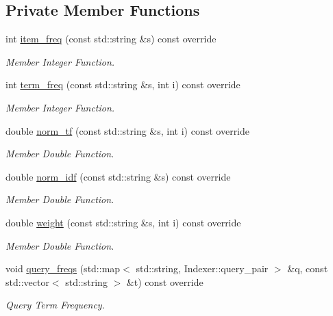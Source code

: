 \subsection*{Private Member Functions}
\begin{DoxyCompactItemize}
\item 
int \hyperlink{class_document_indexer_a302fed9a2c33a60bc7d9d7bcb03902fa}{item\+\_\+freq} (const std\+::string \&s) const override
\begin{DoxyCompactList}\small\item\em Member Integer Function. \end{DoxyCompactList}\item 
int \hyperlink{class_document_indexer_aba9275a0648629cab3772e75519938e8}{term\+\_\+freq} (const std\+::string \&s, int i) const override
\begin{DoxyCompactList}\small\item\em Member Integer Function. \end{DoxyCompactList}\item 
double \hyperlink{class_document_indexer_a91cbacd5c82134b2ba6ab79e06fa4a60}{norm\+\_\+tf} (const std\+::string \&s, int i) const override
\begin{DoxyCompactList}\small\item\em Member Double Function. \end{DoxyCompactList}\item 
double \hyperlink{class_document_indexer_a1c366e241572edc6e1d256db906cac43}{norm\+\_\+idf} (const std\+::string \&s) const override
\begin{DoxyCompactList}\small\item\em Member Double Function. \end{DoxyCompactList}\item 
double \hyperlink{class_document_indexer_aa637e8bce87c52d0d78bfebe8af02f13}{weight} (const std\+::string \&s, int i) const override
\begin{DoxyCompactList}\small\item\em Member Double Function. \end{DoxyCompactList}\item 
void \hyperlink{class_document_indexer_a48d441022f2f6ea3437f5a67b318e06e}{query\+\_\+freqs} (std\+::map$<$ std\+::string, Indexer\+::query\+\_\+pair $>$ \&q, const std\+::vector$<$ std\+::string $>$ \&t) const override
\begin{DoxyCompactList}\small\item\em Query Term Frequency. \end{DoxyCompactList}\item 

\end{DoxyCompactItemize}
